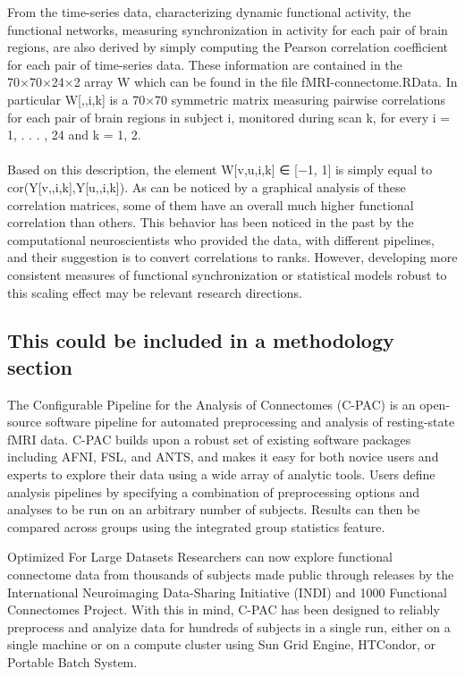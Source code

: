 \documentclass{article}
\begin{document}
From the time-series data, characterizing dynamic functional activity,
the functional networks, measuring synchronization in activity for each pair of brain regions, are also derived by simply computing the Pearson correlation coefficient for each pair of time-series data. These information are contained in the 70×70×24×2 array W which can be found in the file fMRI-connectome.RData. In particular W[,,i,k] is a 70×70 symmetric matrix measuring pairwise correlations for each pair of brain regions in subject i, monitored during scan k, for every i = 1, . . . , 24 and k = 1, 2.\\\\
Based on this description, the element W[v,u,i,k] ∈ [−1, 1] is simply equal to cor(Y[v,,i,k],Y[u,,i,k]). As can be noticed by a graphical analysis of these correlation matrices, some of them have an overall much higher functional correlation than others. This behavior has been noticed in the past by the computational neuroscientists who provided the data, with different pipelines, and their suggestion is to convert correlations to ranks. However, developing more consistent measures of functional synchronization or statistical models robust to this scaling effect may be relevant research directions.


\subsection{This could be included in a methodology section}
The Configurable Pipeline for the Analysis of Connectomes (C-PAC) is an open-source software pipeline for automated preprocessing and analysis of resting-state fMRI data. C-PAC builds upon a robust set of existing software packages including AFNI, FSL, and ANTS, and makes it easy for both novice users and experts to explore their data using a wide array of analytic tools. Users define analysis pipelines by specifying a combination of preprocessing options and analyses to be run on an arbitrary number of subjects. Results can then be compared across groups using the integrated group statistics feature.

Optimized For Large Datasets
Researchers can now explore functional connectome data from thousands of subjects made public through releases by the International Neuroimaging Data-Sharing Initiative (INDI) and 1000 Functional Connectomes Project. With this in mind, C-PAC has been designed to reliably preprocess and analyize data for hundreds of subjects in a single run, either on a single machine or on a compute cluster using Sun Grid Engine, HTCondor, or Portable Batch System.
\end{document}
